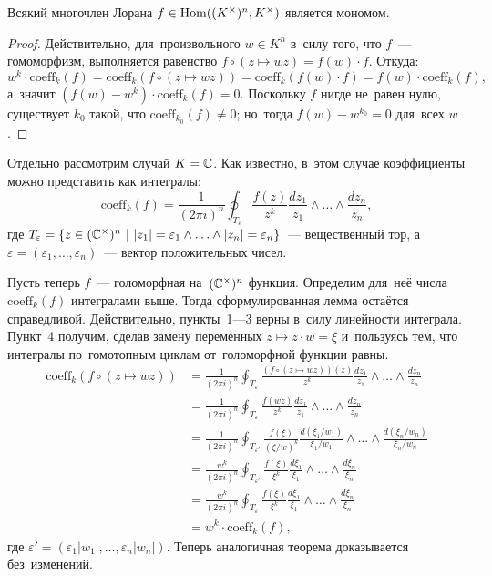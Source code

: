 \documentclass{article}
\begin{document}
\begin{theorem*}
    Всякий многочлен Лорана $f \in \mathrm{Hom}((K^\times)^n, K^\times)$ является мономом.
\end{theorem*}

\begin{proof}
    Действительно, для~произвольного $w \in K^n$ в~силу того, что $f$~— гомоморфизм,
    выполняется равенство $f \circ (z \mapsto wz) = f(w) \cdot f$. Откуда:
    $$
        w^k \cdot \mathrm{coeff}_k(f) = \mathrm{coeff}_k(f \circ (z \mapsto wz)) = \mathrm{coeff}_k(f(w) \cdot f) = f(w) \cdot \mathrm{coeff}_k(f),
    $$
    а~значит $(f(w) - w^k) \cdot \mathrm{coeff}_k(f) = 0$.
    Поскольку $f$ нигде не~равен нулю, существует $k_0$ такой, что $\mathrm{coeff}_{k_0}(f) \neq 0$;
    но~тогда $f(w) - w^{k_0} = 0$ для~всех $w$.
\end{proof}

Отдельно рассмотрим случай $K = \mathbb{C}$. Как известно, в~этом случае коэффициенты можно представить как интегралы:
$$
    \mathrm{coeff}_k(f) = \frac{1}{(2 \pi i)^n} \oint_{T_\varepsilon} \frac{f(z)}{z^k} \frac{dz_1}{z_1} \wedge \ldots \wedge \frac{dz_n}{z_n},
$$
где $T_\varepsilon = \{ z \in (\torus)^n\ |\ |z_1| = \varepsilon_1 \wedge \ldots \wedge |z_n| = \varepsilon_n \}$~— вещественный тор,
а~$\varepsilon = (\varepsilon_1, \ldots, \varepsilon_n)$~— вектор положительных чисел.

Пусть теперь $f$~— голоморфная на~$(\mathbb{C}^\times)^n$ функция. Определим для~неё числа $\mathrm{coeff}_k(f)$ интегралами выше.
Тогда сформулированная лемма остаётся справедливой. Действительно, пункты~1—3 верны в~силу линейности интеграла.
Пункт~4 получим, сделав замену переменных $z \mapsto z \cdot w = \xi$ и~пользуясь тем, что интегралы
по~гомотопным циклам от~голоморфной функции равны.
\begin{align*}
    \mathrm{coeff}_k(f \circ (z \mapsto wz)) &= \frac{1}{(2 \pi i)^n} \oint_{T_\varepsilon} \frac{(f \circ (z \mapsto wz))(z)}{z^k} \frac{dz_1}{z_1} \wedge \ldots \wedge \frac{dz_n}{z_n} \\
                                             &= \frac{1}{(2 \pi i)^n} \oint_{T_\varepsilon} \frac{f(wz)}{z^k} \frac{dz_1}{z_1} \wedge \ldots \wedge \frac{dz_n}{z_n} \\
                                             &= \frac{1}{(2 \pi i)^n} \oint_{T_{\varepsilon'}} \frac{f(\xi)}{(\xi / w)^k} \frac{d(\xi_1 / w_1)}{\xi_1 / w_1} \wedge \ldots \wedge \frac{d(\xi_n / w_n)}{\xi_n / w_n} \\
                                             &= \frac{w^k}{(2 \pi i)^n} \oint_{T_{\varepsilon'}} \frac{f(\xi)}{\xi^k} \frac{d\xi_1}{\xi_1} \wedge \ldots \wedge \frac{d\xi_n}{\xi_n} \\
                                             &= \frac{w^k}{(2 \pi i)^n} \oint_{T_{\varepsilon}} \frac{f(\xi)}{\xi^k} \frac{d\xi_1}{\xi_1} \wedge \ldots \wedge \frac{d\xi_n}{\xi_n} \\
                                             &= w^k \cdot \mathrm{coeff}_k(f),
\end{align*}
где $\varepsilon' = (\varepsilon_1 |w_1|, \ldots, \varepsilon_n |w_n|)$.
Теперь аналогичная теорема доказывается без~изменений.
\end{document}
